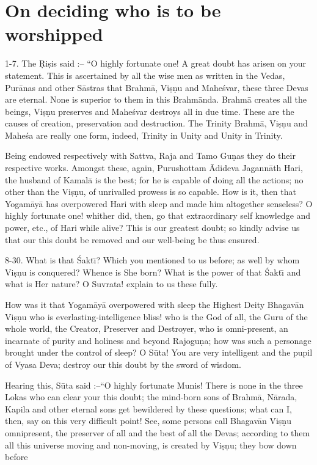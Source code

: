 \chapter{On deciding who is to be worshipped}

1-7. The \d{R}i\d{s}is said :-- ``O highly fortunate one! A great doubt has arisen on your statement. This is ascertained by all the wise men as written in the Vedas, Pur\=anas and other S\=astras that Brahm\=a, Vi\d{s}\d{n}u and Mahe\'svar, these three Devas are eternal. None is superior to them in this Brahm\=anda. Brahm\=a creates all the beings, Vi\d{s}\d{n}u preserves and Mahe\'svar destroys all in due time. These are the causes of creation, preservation and destruction. The Trinity Brahm\=a, Vi\d{s}\d{n}u and Mahe\'sa are really one form, indeed, Trinity in Unity and Unity in Trinity.

Being endowed respectively with Sattva, Raja and Tamo Gu\d{n}as they do their respective works. Amongst these, again, Purushottam \=Adideva Jagann\=ath Hari, the husband of Kamal\=a is the best; for he is capable of doing all the actions; no other than the Vi\d{s}\d{n}u, of unrivalled prowess is so capable. How is it, then that Yogam\=ay\=a has overpowered Hari with sleep and made him altogether senseless? O highly fortunate one! whither did, then, go that extraordinary self knowledge and power, etc., of Hari while alive? This is our greatest doubt; so kindly advise us that our this doubt be removed and our well-being be thus ensured.

8-30. What is that \'Sakt\={\i}? Which you mentioned to us before; as well by whom Vi\d{s}\d{n}u is conquered? Whence is She born? What is the power of that \'Sakt\={\i} and what is Her nature? O Suvrata! explain to us these fully.

How was it that Yogam\=ay\=a overpowered with sleep the Highest Deity Bhagav\=an Vi\d{s}\d{n}u who is everlasting-intelligence bliss! who is the God of all, the Guru of the whole world, the Creator, Preserver and Destroyer, who is omni-present, an incarnate of purity and holiness and beyond Rajogu\d{n}a; how was such a personage brought under the control of sleep? O S\=uta! You are very intelligent and the pupil of Vyasa Deva; destroy our this doubt by the sword of wisdom.

Hearing this, S\=uta said :--``O highly fortunate Munis! There is none in the three Lokas who can clear your this doubt; the mind-born sons of Brahm\=a, N\=arada, Kapila and other eternal sons get bewildered by these questions; what can I, then, say on this very difficult point! See, some persons call Bhagav\=an Vi\d{s}\d{n}u omnipresent, the preserver of all and the best of all the Devas; according to them all this universe moving and non-moving, is created by Vi\d{s}\d{n}u; they bow down before

